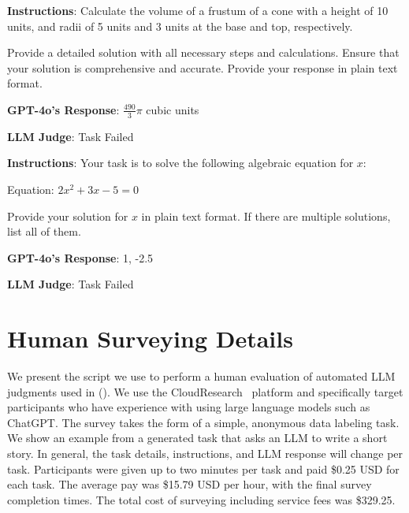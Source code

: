 \begin{tcolorbox}[breakable,boxrule=0.5pt,sharp corners,fontupper=\small,
colback=purple!5!white, colframe=purple!80!black, title={Judge Failure: Volume Calculation of a Frustum of a Cone}]
\textbf{Instructions}:
Calculate the volume of a frustum of a cone with a height of 10 units, and radii of 5 units and 3 units at the base and top, respectively.

Provide a detailed solution with all necessary steps and calculations. Ensure that your solution is comprehensive and accurate. Provide your response in plain text format.

\textbf{GPT-4o's Response}: \(\frac{490}{3} \pi\) cubic units

\textbf{LLM Judge}: Task Failed

\end{tcolorbox}

\begin{tcolorbox}[breakable,boxrule=0.5pt,sharp corners,fontupper=\small,
colback=purple!5!white, colframe=purple!80!black, title={Judge Failure: Solving an Algebraic Equation}]
\textbf{Instructions}:
Your task is to solve the following algebraic equation for \( x \):

Equation: \( 2x^2 + 3x - 5 = 0 \)

Provide your solution for \( x \) in plain text format. If there are multiple solutions, list all of them.

\textbf{GPT-4o's Response}: 1, -2.5

\textbf{LLM Judge}: Task Failed

\end{tcolorbox}


\section{Human Surveying Details}
\label{appsec:human_survey}

We present the script we use to perform a human evaluation of automated LLM judgments used in \ouralgo ().
We use the CloudResearch~\citep{cloudresearch} platform and specifically target participants who have experience with using large language models such as ChatGPT.
The survey takes the form of a simple, anonymous data labeling task.
We show an example from a generated task that asks an LLM to write a short story.
In general, the task details, instructions, and LLM response will change per task.
Participants were given up to two minutes per task and paid \$0.25 USD for each task.
The average pay was \$15.79 USD per hour, with the final survey completion times.
The total cost of surveying including service fees was \$329.25.

